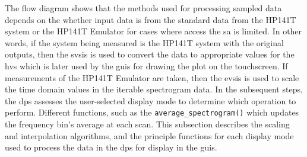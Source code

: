 \documentclass[class=report,11pt,crop=false]{standalone}
\begin{document}
	The flow diagram shows that the methods used for processing sampled data depends on the whether input data is from the standard data from the HP141T system or the HP141T Emulator for cases where access the \acrshort{sa} is limited. In other words, if the system being measured is the HP141T system with the original outputs, then the \acrfull{svsis} is used to convert the data to appropriate values for the \acrfull{hvs} which is later used by the \acrshort{guis} for drawing the plot on the touchscreen. If measurements of the HP141T Emulator are taken, then the \acrfull{evsis} is used to scale the time domain values in the iterable spectrogram data. In the subsequent steps, the \acrshort{dps} assesses the user-selected display mode to determine which operation to perform. Different functions, such as the \texttt{average\_spectrogram()} which updates the frequency bin's average at each scan. This subsection describes the scaling and interpolation algorithms, and the principle functions for each display mode used to process the data in the \acrshort{dps} for display in the \acrshort{guis}.
	
\end{document}
